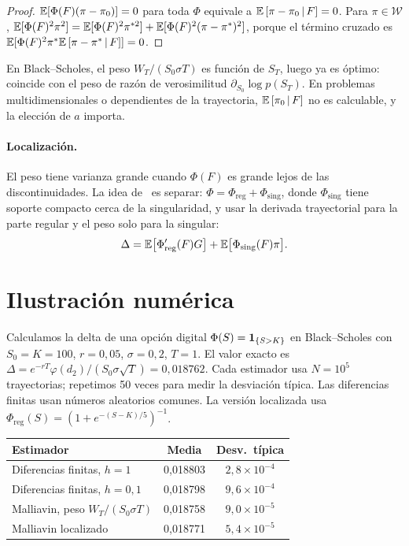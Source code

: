 \begin{proof}
$\mathbb{E}[\Phi(F)(\pi-\pi_0)]=0$ para toda $\Phi$ equivale a $\mathbb{E}\left[\pi-\pi_0\,\middle|\,F\right]=0$. Para
$\pi\in\mathcal W$, $\mathbb{E}[\Phi(F)^2\pi^2]=\mathbb{E}[\Phi(F)^2\pi^{*2}]+\mathbb{E}[\Phi(F)^2(\pi-\pi^*)^2]$, porque el término cruzado es
$\mathbb{E}[\Phi(F)^2\pi^*\mathbb{E}\left[\pi-\pi^*\,\middle|\,F\right]]=0$.
\end{proof}

En Black--Scholes, el peso $W_T/(S_0\sigma T)$ es función de $S_T$, luego ya es óptimo: coincide con el
peso de razón de verosimilitud $\partial_{S_0}\log p(S_T)$. En problemas multidimensionales o dependientes
de la trayectoria, $\mathbb{E}\left[\pi_0\,\middle|\,F\right]$ no es calculable, y la elección de $a$ importa.

\paragraph{Localización.} El peso tiene varianza grande cuando $\Phi(F)$ es grande lejos de las discontinuidades.
La idea de~\cite{Fournie99,Fournie01} es separar: $\Phi=\Phi_{\mathrm{reg}}+\Phi_{\mathrm{sing}}$, donde $\Phi_{\mathrm{sing}}$ tiene soporte compacto
cerca de la singularidad, y usar la derivada trayectorial para la parte regular y el peso solo para
la singular:
\[
  \Delta=\mathbb{E}\big[\Phi_{\mathrm{reg}}'(F)G\big]+\mathbb{E}\big[\Phi_{\mathrm{sing}}(F)\pi\big].
\]

\section{Ilustración numérica}
Calculamos la delta de una opción digital $\Phi(S)=\mathbf{1}_{\{S>K\}}$ en Black--Scholes con $S_0=K=100$,
$r=0{,}05$, $\sigma=0{,}2$, $T=1$. El valor exacto es $\Delta=e^{-rT}\varphi(d_2)/(S_0\sigma\sqrt T)=0{,}018762$. Cada
estimador usa $N=10^5$ trayectorias; repetimos 50 veces para medir la desviación típica. Las
diferencias finitas usan números aleatorios comunes. La versión localizada usa $\Phi_{\mathrm{reg}}(S)=
(1+e^{-(S-K)/5})^{-1}$.

\begin{center}
\begin{tabular}{lcc}
\toprule
Estimador & Media & Desv.\ típica\\
\midrule
Diferencias finitas, $h=1$ & 0,018803 & $2{,}8\times10^{-4}$\\
Diferencias finitas, $h=0{,}1$ & 0,018798 & $9{,}6\times10^{-4}$\\
Malliavin, peso $W_T/(S_0\sigma T)$ & 0,018758 & $9{,}0\times10^{-5}$\\
Malliavin localizado & 0,018771 & $5{,}4\times10^{-5}$\\
\bottomrule
\end{tabular}
\end{center}

